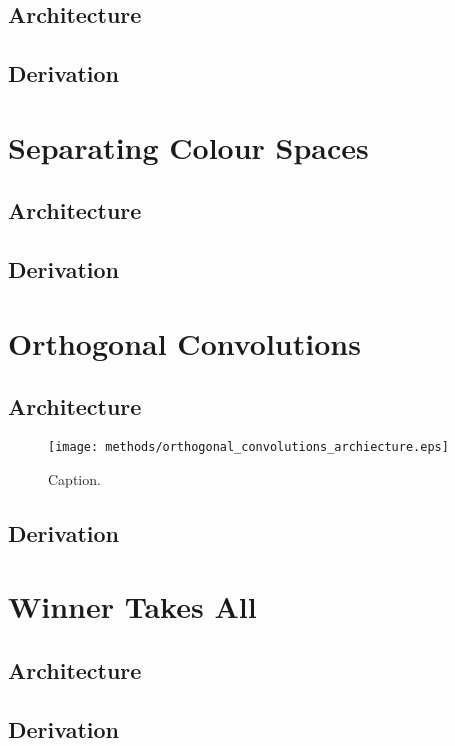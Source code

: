\subsection{Architecture}
\subsection{Derivation}

%
%
%
%
%
\section{Separating Colour Spaces}
\lipsum[2]
\subsection{Architecture}
\subsection{Derivation}

%
%
%
%
%
\section{Orthogonal Convolutions}
\lipsum[2]
\subsection{Architecture}
\begin{figure}[h!]
\centering
\captionsetup{justification=centering}
\texttt{[image: methods/orthogonal\_convolutions\_archiecture.eps]}
\caption{Caption.}
\label{fig:orthogonal_convolutions_archiecture}
\end{figure}

\subsection{Derivation}

%
%
%
%
%
\section{Winner Takes All}
\lipsum[2]
\subsection{Architecture}
\subsection{Derivation}
